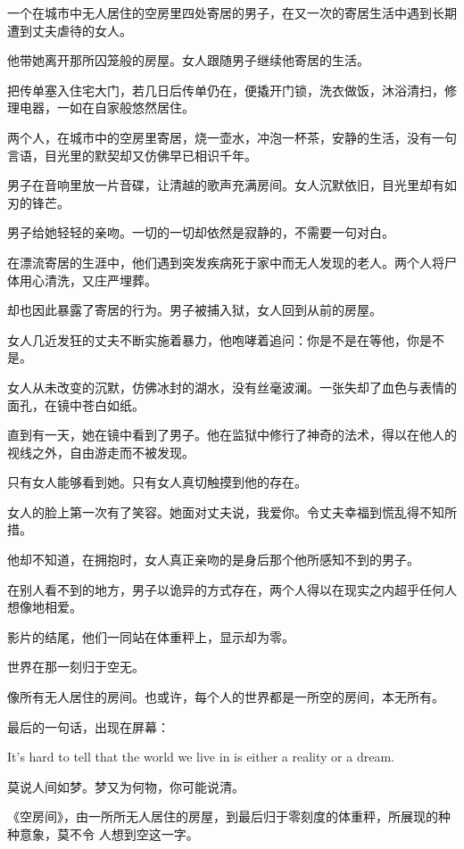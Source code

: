 		一个在城市中无人居住的空房里四处寄居的男子，在又一次的寄居生活中遇到长期遭到丈夫虐待的女人。\par
		他带她离开那所囚笼般的房屋。女人跟随男子继续他寄居的生活。\par
		把传单塞入住宅大门，若几日后传单仍在，便撬开门锁，洗衣做饭，沐浴清扫，修理电器，一如在自家般悠然居住。\par
		两个人，在城市中的空房里寄居，烧一壶水，冲泡一杯茶，安静的生活，没有一句言语，目光里的默契却又仿佛早已相识千年。\par
		男子在音响里放一片音碟，让清越的歌声充满房间。女人沉默依旧，目光里却有如刃的锋芒。\par
		男子给她轻轻的亲吻。一切的一切却依然是寂静的，不需要一句对白。\par
		在漂流寄居的生涯中，他们遇到突发疾病死于家中而无人发现的老人。两个人将尸体用心清洗，又庄严埋葬。\par
		却也因此暴露了寄居的行为。男子被捕入狱，女人回到从前的房屋。\par
		女人几近发狂的丈夫不断实施着暴力，他咆哮着追问：你是不是在等他，你是不是。\par
		女人从未改变的沉默，仿佛冰封的湖水，没有丝毫波澜。一张失却了血色与表情的面孔，在镜中苍白如纸。\par
		直到有一天，她在镜中看到了男子。他在监狱中修行了神奇的法术，得以在他人的视线之外，自由游走而不被发现。\par
		只有女人能够看到她。只有女人真切触摸到他的存在。\par
		女人的脸上第一次有了笑容。她面对丈夫说，我爱你。令丈夫幸福到慌乱得不知所措。\par
		他却不知道，在拥抱时，女人真正亲吻的是身后那个他所感知不到的男子。\par
		在别人看不到的地方，男子以诡异的方式存在，两个人得以在现实之内超乎任何人想像地相爱。\par
		影片的结尾，他们一同站在体重秤上，显示却为零。\par
		世界在那一刻归于空无。\par
		像所有无人居住的房间。也或许，每个人的世界都是一所空的房间，本无所有。\par
		最后的一句话，出现在屏幕：\par
		It's hard to tell that the world we live in is either a reality or a dream.

		莫说人间如梦。梦又为何物，你可能说清。



		《空房间》，由一所所无人居住的房屋，到最后归于零刻度的体重秤，所展现的种种意象，莫不令
	人想到空这一字。

